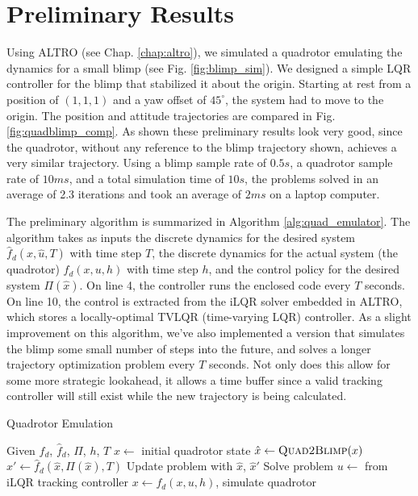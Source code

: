 \documentclass[../root.tex]{subfiles}
\begin{document}
\section{Preliminary Results} Using ALTRO (see Chap. \ref{chap:altro}), we
simulated a quadrotor emulating the dynamics for a small blimp (see Fig.
\ref{fig:blimp_sim}). We designed a simple LQR controller for the blimp that
stabilized it about the origin. Starting at rest from a position of $(1,1,1)$
and a yaw offset of $45^\circ$, the system had to move to the origin. The
position and attitude trajectories are compared in Fig.
\ref{fig:quadblimp_comp}. As shown these preliminary results look very good,
since the quadrotor, without any reference to the blimp trajectory shown,
achieves a very similar trajectory. Using a blimp sample rate of $0.5 s$, a
quadrotor sample rate of $10 ms$, and a total simulation time of $10 s$, the
problems solved in an average of 2.3 iterations and took an average of $2 ms$
on a laptop computer.

The preliminary algorithm is summarized in Algorithm \ref{alg:quad_emulator}.
The algorithm takes as inputs the discrete dynamics for the desired 
system $\hat{f}_d(\hat{x},\hat{u},T)$ with time step $T$, 
the discrete dynamics for the 
actual system (the quadrotor) $f_d(x,u,h)$ with time step $h$, and 
the control policy for the desired system $\Pi(\hat{x})$. On line 4, 
the controller runs the enclosed code every $T$ seconds.
On line 10, the control is extracted from the iLQR solver embedded in 
ALTRO, which stores a locally-optimal TVLQR (time-varying LQR) controller.
As a slight improvement on this algorithm, we've also implemented a version
that simulates the blimp some small number of steps into the future, and 
solves a longer trajectory optimization problem every $T$ seconds. Not 
only does this allow for some more strategic lookahead, it allows a time 
buffer since a valid tracking controller will still exist while the 
new trajectory is being calculated. 

\begin{algorithm}
\begin{algorithmic}[1] \label{alg:quad_emulator}
    \caption{Quadrotor Emulation}
    \State Given $f_d$, $\hat{f}_d$, $\Pi$, $h$, $T$
    \State $x \leftarrow$ initial quadrotor state
            \State $\hat{x} \leftarrow \textproc{Quad2Blimp}(x)$
            \State $\hat{x}' \leftarrow \hat{f}_d(\hat{x}, \Pi(\hat{x}),T)$
            \State Update problem with $\hat{x}$, $\hat{x}'$
            \State Solve problem
        \EndIf
        \State $u \leftarrow$ from iLQR tracking controller
        \State $x \leftarrow f_d(x,u,h)$, simulate quadrotor
    \EndWhile
\end{algorithmic}
\end{algorithm}
\end{document}
